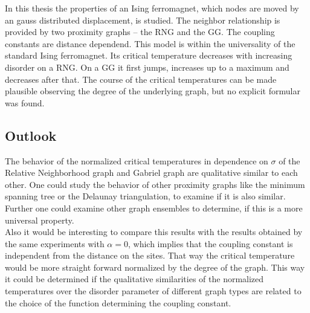 In this thesis the properties of an Ising ferromagnet, which nodes are
moved by an gauss distributed displacement, is studied. The neighbor
relationship is provided by two proximity graphs -- the RNG and the GG.
The coupling constants are distance dependend. This model is within the
universality of the standard Ising ferromagnet. Its critical temperature
decreases with increasing disorder on a RNG. On a GG it first jumps,
increases up to a maximum and decreases after that. The course of the
critical temperatures can be made plausible observing the degree of the
underlying graph, but no explicit formular was found.

\subsection{Outlook}
    The behavior of the normalized critical temperatures in dependence
    on \(\sigma\) of the Relative Neighborhood graph and Gabriel graph
    are qualitative similar to each other. One could study the behavior
    of other proximity graphs like the minimum spanning tree or the
    Delaunay triangulation, to examine if it is also similar. Further
    one could examine other graph ensembles to determine, if this is a
    more universal property.\\
    Also it would be interesting to compare this results with the
    results obtained by the same experiments with \(\alpha = 0\), which
    implies that the coupling constant is independent from the distance
    on the sites. That way the critical temperature would be more
    straight forward normalized by the degree of the graph. This way it
    could be determined if the qualitative similarities of the
    normalized temperatures over the disorder parameter of different
    graph types are related to the choice of the function determining the
    coupling constant.
